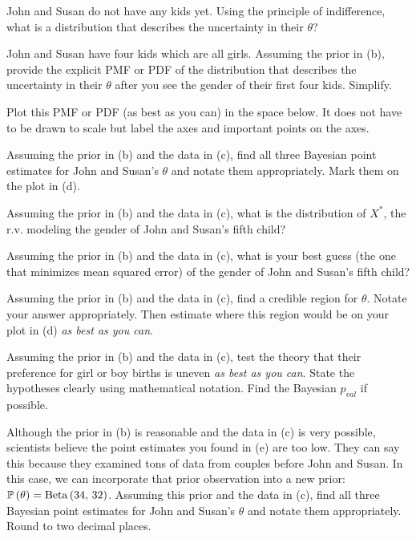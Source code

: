 \documentclass[12pt]{article}
\begin{document}
 John and Susan do not have any kids yet. Using the principle of indifference, what is a distribution that describes the uncertainty in their $\theta$?

 John and Susan have four kids which are all girls. Assuming the prior in (b), provide the explicit PMF or PDF of the distribution that describes the uncertainty in their $\theta$ after you see the gender of their first four kids. Simplify. 


 Plot this PMF or PDF (as best as you can) in the space below. It does not have to be drawn to scale but label the axes and important points on the axes. 


 Assuming the prior in (b) and the data in (c), find all three Bayesian point estimates for John and Susan's $\theta$ and notate them appropriately. Mark them on the plot in (d). 

 Assuming the prior in (b) and the data in (c), what is the distribution of $X^*$, the r.v. modeling the gender of John and Susan's fifth child? 


 Assuming the prior in (b) and the data in (c), what is your best guess (the one that minimizes mean squared error) of the gender of John and Susan's fifth child? 

 Assuming the prior in (b) and the data in (c), find a credible region for $\theta$. Notate your answer appropriately. Then estimate where this region would be on your plot in (d) \emph{as best as you can}. 

 Assuming the prior in (b) and the data in (c), test the theory that their preference for girl or boy births is uneven \emph{as best as you can}. State the hypotheses clearly using mathematical notation. Find the Bayesian $p_{val}$ if possible.


 Although the prior in (b) is reasonable and the data in (c) is very possible, scientists believe the point estimates you found in (e) are too low. They can say this because they examined tons of data from couples before John and Susan. In this case, we can incorporate that prior observation into a new prior:  $\mathbb{P}\left(\theta\right) = \mathrm{Beta}\left(34,\,32\right)$. Assuming this prior and the data in (c), find all three Bayesian point estimates for John and Susan's $\theta$ and notate them appropriately. Round to two decimal places. 
\end{document}
